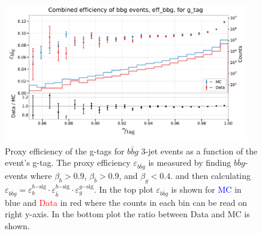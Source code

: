 \begin{figure}
  \centerfloat
  \includegraphics[width=0.95\textwidth, trim=0 0 0 40, clip]{figures/quarks/eff_bbg_gtag-down_sample=1.00-ML_vars=vertex-selection=b-ejet_min=4-n_iter_RS_lgb=99-n_iter_RS_xgb=9-cdot_cut=0.90-version=19.pdf}
  \caption[g-Tagging proxy efficiency for $b\bar{b}g$-events as function of g-tag]
          {Proxy efficiency of the g-tags for $b\bar{b}g$ 3-jet events as a function of the event's g-tag. The proxy efficiency $\varepsilon_{b\bar{b}g}$ is measured by finding $b\bar{b}g$-events where $\beta_b > 0.9$, $\beta_{\bar{b}}>0.9$, and $\beta_g < 0.4$. and then calculating  $\varepsilon_{b\bar{b}g} = \varepsilon_b^{b\mathrm{-sig}} \cdot \varepsilon_{\bar{b}}^{b\mathrm{-sig}} \cdot  \varepsilon_g^{g\mathrm{-sig}} $. In the top plot $\varepsilon_{b\bar{b}g}$ is shown for \textcolor{blue}{MC} in blue and \textcolor{red}{Data} in red where the counts in each bin can be read on right y-axis. In the bottom plot the ratio between Data and MC is shown.
          } 
  \label{fig:q:effiency_btag_bbg_gtag}
\end{figure}



